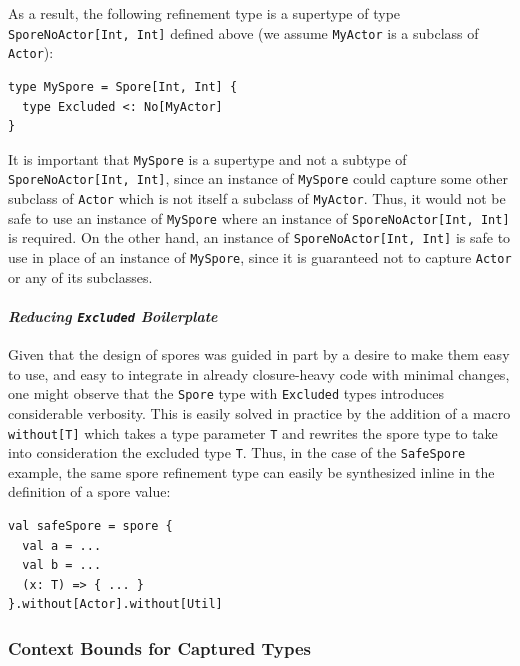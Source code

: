 \documentclass[runningheads]{llncs}
\begin{document}
\begin{sloppypar}
As a result, the following refinement type is a supertype of type\\
\verb|SporeNoActor[Int, Int]| defined above (we assume \verb|MyActor| is a subclass of \verb|Actor|):

\begin{lstlisting}
type MySpore = Spore[Int, Int] {
  type Excluded <: No[MyActor]
}
\end{lstlisting}
\noindent
It is important that \verb|MySpore| is a supertype and not a subtype of\\
\verb|SporeNoActor[Int, Int]|, since an instance of \verb|MySpore| could capture some other subclass of \verb|Actor| which is not itself a subclass of \verb|MyActor|. Thus, it would not be safe to use an instance of \verb|MySpore| where an instance of \verb|SporeNoActor[Int, Int]| is required. On the other hand, an instance of \verb|SporeNoActor[Int, Int]| is safe to use in place of an instance of \verb|MySpore|, since it is guaranteed not to capture \verb|Actor| or any of its subclasses.

\paragraph{\textbf{\textit{Reducing \texttt{Excluded} Boilerplate}}}

Given that the design of spores was guided in part by a desire to make them
easy to use, and easy to integrate in already closure-heavy code with minimal
changes, one might observe that the \verb|Spore| type with \verb|Excluded|
types introduces considerable verbosity. This is easily solved in practice by
the addition of a macro \verb|without[T]| which takes a type parameter
\verb|T| and rewrites the spore type to take into consideration the excluded
type \verb|T|. Thus, in the case of the \verb|SafeSpore| example, the same spore
refinement type can easily be synthesized inline in the definition of a spore value:

\begin{lstlisting}
val safeSpore = spore {
  val a = ...
  val b = ...
  (x: T) => { ... }
}.without[Actor].without[Util]
\end{lstlisting}

\subsubsection{Context Bounds for Captured Types}
\label{sec:context-bounds}


\end{sloppypar}
\end{document}

